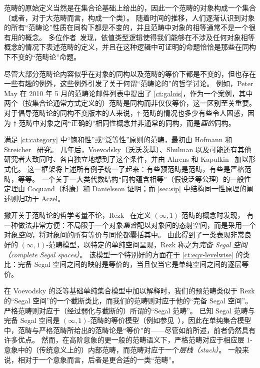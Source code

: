 \sectionNotes

范畴的原始定义当然是在集合论基础上给出的，因此一个范畴的对象构成一个集合（或者，对于大范畴而言，构成一个类）。
随着时间的推移，人们逐渐认识到对象的所有``范畴论''性质在同构下都是不变的，并且范畴中对象的相等通常不是一个很有用的概念。
多位作者~\cite{blanc:eqv-log,freyd:invar-eqv,makkai:folds,makkai:comparing}发现，依值类型逻辑使得我们能够在不涉及任何对象相等概念的情况下表述范畴的定义，并且在这种逻辑中可证明的命题恰恰是那些在同构下不变的``范畴论''命题。
%

尽管大部分范畴论内容似乎在对象的同构以及范畴的等价下都是不变的，但也存在一些有趣的例外，这些例外引发了关于何谓``范畴论的''的哲学讨论。
例如，Peter May 在 2010 年 5 月的范畴论邮件列表中提出了 \cref{ct:galois}，作为一个案例，其中两个（按集合论通常方式定义的）范畴是同构而非仅仅等价，这一区别至关重要。
对于倡导范畴论的同构不变版本的人来说，$\dagger$-范畴的情况也多少有些令人困惑，因为 $\dagger$-范畴中对象之间``正确的''相同性概念并非通常的同构，而是\emph{酉的}同构。
%

满足 \cref{ct:category} 中``饱和性''或``泛等性''原则的范畴，最初由 Hofmann 和 Streicher~\cite{hs:gpd-typethy} 研究。
几年后，Voevodsky（沃沃茨基）、Shulman 以及可能还有其他研究者大致同时、各自独立地想到了这个条件，并由 Ahrens 和 Kapulkin~\cite{aks:rezk} 加以形式化。
这一框架将上述所有例子统一了起来：有些预范畴是范畴，有些是严格范畴，等等。
一个关于一大类代数结构``同构蕴含相等''（假设泛等公理）的一般性定理由 Coquand（科康）和 Danielsson 证明；而 \cref{sec:sip} 中结构同一性原理的阐述则归功于 Aczel。

撇开关于范畴论的哲学考量不论，Rezk~\cite{rezk01css} 在定义 $(\infty,1)$-范畴的概念时发现，
%
有一种做法非常方便：不局限于一个对象\emph{集合}配以对象间的态射空间，而是采用一个对象\emph{空间}，将对象间的所有等价与同伦都囊括其中。
由此得到了一类表现非常良好的 $(\infty,1)$-范畴模型，以特定的单纯空间呈现，Rezk 称之为\emph{完备 Segal 空间（complete Segal spaces）}。
%
%
该模型一个特别好的方面在于 \cref{ct:eqv-levelwise} 的类比：完备 Segal 空间之间的映射是等价的，当且仅当它是单纯空间之间的逐层等价。

在 Voevodsky 的泛等基础单纯集合模型中加以解释时，我们的预范畴类似于 Rezk 的``Segal 空间''的一个截断类比，而我们的范畴则对应于他的``完备 Segal 空间''。
%
严格范畴则对应于（经过弱化与截断的）所谓的``Segal 范畴''。
已知 Segal 范畴与完备 Segal 空间是 $(\infty,1)$-范畴的等价模型（例如参见~\cite{bergner:infty-one}），因此在单纯集合模型中，范畴与严格范畴所给出的范畴论是``等价''的——尽管如前所述，前者仍然具有许多优点。
然而，在高阶意象的更一般的范畴语义下，严格范畴对应于相应层 1-意象中的（传统意义上的）内部范畴，而范畴对应于一个\emph{层栈（stack）}。
%
一般来说，相对于一个意象而言，后者是更合适的一类``范畴''。

